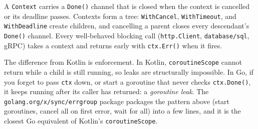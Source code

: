 A \texttt{Context} carries a \texttt{Done()} channel that is closed when the context is cancelled or its deadline passes. Contexts form a tree: \texttt{WithCancel}, \texttt{WithTimeout}, and \texttt{WithDeadline} create children, and cancelling a parent closes every descendant's \texttt{Done()} channel. Every well-behaved blocking call (\texttt{http.Client}, \texttt{database/sql}, gRPC) takes a context and returns early with \texttt{ctx.Err()} when it fires.

The difference from Kotlin is enforcement. In Kotlin, \texttt{coroutineScope} cannot return while a child is still running, so leaks are structurally impossible. In Go, if you forget to pass \texttt{ctx} down, or start a goroutine that never checks \texttt{ctx.Done()}, it keeps running after its caller has returned: a \emph{goroutine leak}. The \texttt{golang.org/x/sync/errgroup} package packages the pattern above (start goroutines, cancel all on first error, wait for all) into a few lines, and it is the closest Go equivalent of Kotlin's \texttt{coroutineScope}.

